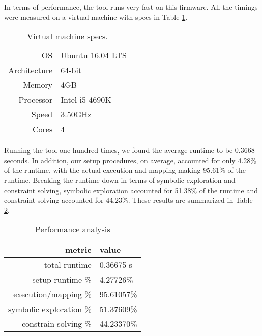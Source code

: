 \documentclass[letterpaper, 10 pt, conference]{ieeeconf}
\begin{document}
In terms of performance, the tool runs very fast on this firmware. All the timings were measured on a virtual machine with specs in Table \ref{table:vm}.

\begin{table}[h]
\centering
\begin{tabular}{r|l}
OS & Ubuntu 16.04 LTS \\
Architecture & 64-bit\\
Memory & 4GB\\
Processor &  Intel i5-4690K\\
Speed &  3.50GHz\\
Cores &  4\\
\end{tabular}
\caption{Virtual machine specs.}
\label{table:vm}
\end{table}

Running the tool one hundred times, we found the average runtime to be 0.3668 seconds. In addition, our setup procedures, on average, accounted for only 4.28\% of the runtime, with the actual execution and mapping making 95.61\% of the runtime. Breaking the runtime down in terms of symbolic exploration and constraint solving, symbolic exploration accounted for 51.38\% of the runtime and constraint solving accounted for 44.23\%. These results are summarized in Table \ref{table:time}.


\begin{table}[h]
\centering
\begin{tabular}{r|l}
metric & value \\ \hline
total runtime & 0.36675 s \\
setup runtime \% & 4.27726\% \\
execution/mapping \% & 95.61057\% \\
symbolic exploration \% & 51.37609\% \\
constrain solving \% & 44.23370\% \\
\end{tabular}
\caption{Performance analysis}
\label{table:time}
\end{table}
\end{document}
